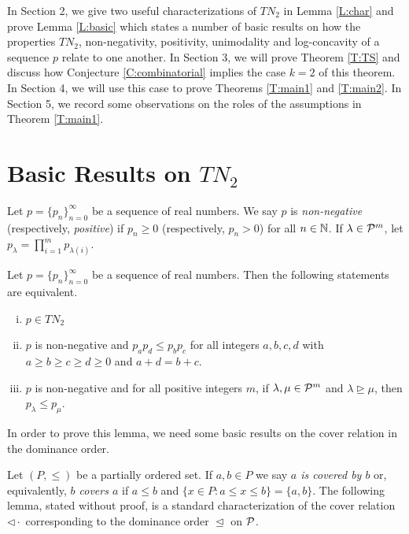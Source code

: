 \documentclass[12pt]{article}
\begin{document}
In Section 2, we give two useful characterizations of $TN_2$ in Lemma \ref{L:char} and prove Lemma \ref{L:basic} which states a number of basic results on how the properties $TN_2$, non-negativity, positivity, unimodality and log-concavity of a sequence $p$ relate to one another.  In Section 3, we will prove Theorem \ref{T:TS} and discuss how Conjecture \ref{C:combinatorial} implies the case $k=2$ of this theorem. In Section 4, we will use this case to prove Theorems \ref{T:main1} and \ref{T:main2}.  In Section 5, we record some observations on the roles of the assumptions in Theorem \ref{T:main1}.


 

\section{Basic Results on $TN_2$} \label{S:TN2}

Let $p = \{p_n\}_{n=0}^\infty$ be a sequence of real numbers.  We say $p$ is \emph{non-negative} (respectively, \emph{positive}) if $p_n \geq 0$ (respectively, $p_n >0$) for all $n \in \mathbb{N}$. If $\lambda \in {\cal P}^m$, let $p_\lambda =  \prod_{i=1}^m p_{\lambda(i)}$.  

\begin{lemma} \label{L:char} Let $p = \{p_n\}_{n=0}^\infty$ be a sequence of real numbers.  Then the following statements are equivalent.

\begin{enumerate}[(i)]

\item $p \in TN_2$

\item $p$ is non-negative and $p_a p_d \leq p_b p_c$ for all integers $a,b,c,d$ with $a \geq b \geq c \geq d \geq 0$ and $a+d = b+c$.

\item $p$ is non-negative and for all positive integers $m$, if $\lambda, \mu \in {\cal P}^m$ and $\lambda \trianglerighteq \mu$, then $p_\lambda \leq p_\mu$.

\end{enumerate}

\end{lemma} 

In order to prove this lemma, we need some basic results on the cover relation in the dominance order.

Let $(P,\leq)$ be a partially ordered set.  If $a,b \in P$ we say \emph{$a$ is covered by $b$} or, equivalently, \emph{$b$ covers $a$} if $a \leq b$ and $\{x \in P : a \leq x \leq b\} = \{a,b\}$.  The following lemma, stated without proof, is a standard characterization of the cover relation $\triangleleft \cdot$ corresponding to the dominance order $\trianglelefteq$ on ${\cal P}$.
\end{document}
